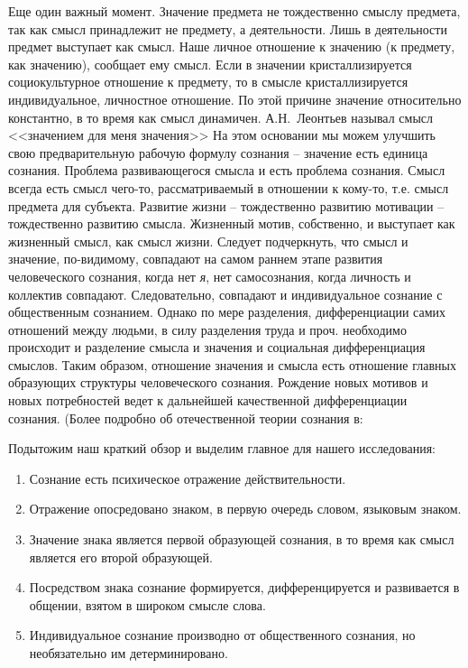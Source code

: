 Еще один важный момент. Значение предмета не тождественно смыслу предмета,
так как смысл принадлежит не предмету, а деятельности\autocite{leontev2005lectures}.
Лишь в деятельности предмет выступает как смысл.
Наше личное отношение к значению (к предмету, как значению), сообщает ему смысл.
Если в значении кристаллизируется социокультурное отношение к предмету,
то в смысле кристаллизируется индивидуальное, личностное отношение.
По этой причине значение относительно константно, в то время как смысл динамичен.
А.Н.~Леонтьев называл смысл <<значением для меня значения>>\autocite{leontev2005lectures}
На этом основании мы можем улучшить свою предварительную рабочую формулу сознания --
значение есть единица сознания. Проблема развивающегося смысла и есть проблема
сознания. Смысл всегда есть смысл чего-то, рассматриваемый в отношении к кому-то,
т.е. смысл предмета для субъекта. Развитие жизни -- тождественно развитию мотивации --
тождественно развитию смысла. Жизненный мотив, собственно, и выступает как жизненный
смысл, как смысл жизни. Следует подчеркнуть, что смысл и значение, по-видимому,
совпадают на самом раннем этапе развития человеческого сознания, когда нет \emph{я},
нет самосознания, когда личность и коллектив совпадают. Следовательно, совпадают и
индивидуальное сознание с общественным сознанием. Однако по мере разделения,
дифференциации самих отношений между людьми, в силу разделения труда и проч.
необходимо происходит и разделение смысла и значения и социальная дифференциация
смыслов. Таким образом, отношение значения и смысла есть отношение главных
образующих структуры человеческого сознания. Рождение новых мотивов и новых
потребностей ведет к дальнейшей качественной дифференциации сознания.
(Более подробно об отечественной теории сознания в: \autocite{leontevan1967}\autocite{leontevan1975}\autocite{leontevan1983}\autocite{vigotski1982}\autocite{leontevaa2001}

Подытожим наш краткий обзор и выделим главное для нашего исследования:
\begin{enumerate}
\item Сознание есть психическое отражение действительности.
\item Отражение опосредовано знаком, в первую очередь словом, языковым знаком.
\item Значение знака является первой образующей сознания, в то время как смысл
  является его второй образующей.
\item Посредством знака сознание формируется, дифференцируется и развивается
  в общении, взятом в широком смысле слова.
\item Индивидуальное сознание производно от общественного сознания,
  но необязательно им детерминировано.
\end{enumerate}

